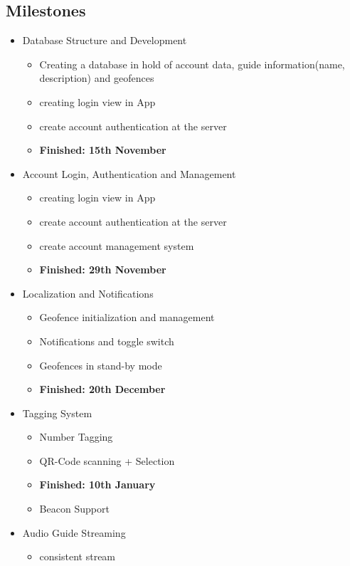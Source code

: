 \documentclass[12pt]{article}
\theoremstyle{definition}
\begin{document}
\subsection{Milestones}
\begin{itemize}
\large \item Database Structure and Development
\begin{itemize}
    \normalsize
    \item Creating a database in hold of account data, guide information(name, description) and geofences
    \item creating login view in App
    \item create account authentication at the server
    \item \textbf{Finished: 15th November}
\end{itemize}
\item Account Login, Authentication and Management
\begin{itemize}
    \normalsize
    \item creating login view in App
    \item create account authentication at the server
    \item create account management system
    \item \textbf{Finished: 29th November}
\end{itemize}
\item Localization and Notifications
\begin{itemize}
    \normalsize
    \item Geofence initialization and management
    \item Notifications and toggle switch
    \item Geofences in stand-by mode
    \item \textbf{Finished: 20th December}
\end{itemize}
\item Tagging System
\begin{itemize}
    \normalsize
    \item Number Tagging
    \item QR-Code scanning + Selection
    \item \textbf{Finished: 10th January}
    \item Beacon Support
\end{itemize}
\item Audio Guide Streaming
\begin{itemize}
    \normalsize
    \item consistent stream 

\end{itemize}
\end{itemize}
\end{document}
